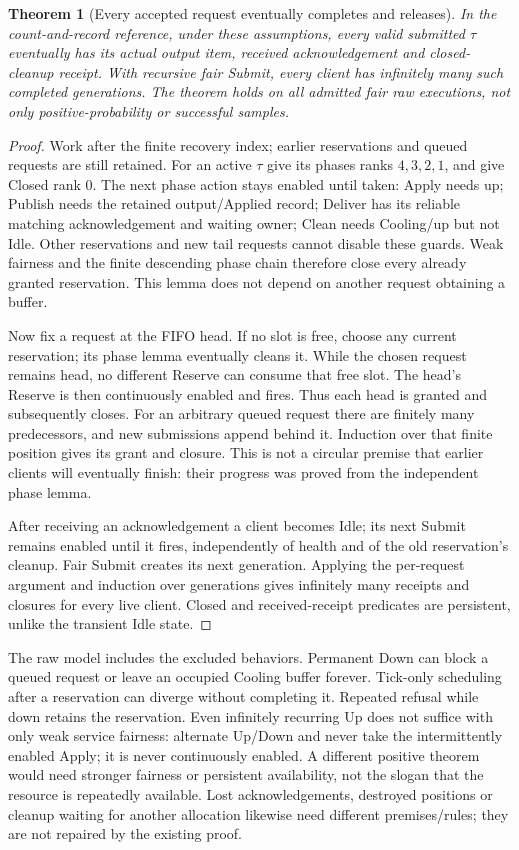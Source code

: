 \documentclass[11pt]{article}
\newtheorem{theorem}{Theorem}
\begin{document}
\begin{theorem}[Every accepted request eventually completes and releases]\label{thm:resource-progress}
In the count-and-record reference, under these assumptions, every valid submitted $\tau$ eventually has its actual output item, received acknowledgement and closed-cleanup receipt. With recursive fair Submit, every client has infinitely many such completed generations. The theorem holds on all admitted fair raw executions, not only positive-probability or successful samples.
\end{theorem}
\begin{proof}
Work after the finite recovery index; earlier reservations and queued requests are still retained. For an active $\tau$ give its phases ranks $4,3,2,1$, and give Closed rank $0$. The next phase action stays enabled until taken: Apply needs up; Publish needs the retained output/Applied record; Deliver has its reliable matching acknowledgement and waiting owner; Clean needs Cooling/up but not Idle. Other reservations and new tail requests cannot disable these guards. Weak fairness and the finite descending phase chain therefore close every already granted reservation. This lemma does not depend on another request obtaining a buffer.

Now fix a request at the FIFO head. If no slot is free, choose any current reservation; its phase lemma eventually cleans it. While the chosen request remains head, no different Reserve can consume that free slot. The head's Reserve is then continuously enabled and fires. Thus each head is granted and subsequently closes. For an arbitrary queued request there are finitely many predecessors, and new submissions append behind it. Induction over that finite position gives its grant and closure. This is not a circular premise that earlier clients will eventually finish: their progress was proved from the independent phase lemma.

After receiving an acknowledgement a client becomes Idle; its next Submit remains enabled until it fires, independently of health and of the old reservation's cleanup. Fair Submit creates its next generation. Applying the per-request argument and induction over generations gives infinitely many receipts and closures for every live client. Closed and received-receipt predicates are persistent, unlike the transient Idle state.
\end{proof}

The raw model includes the excluded behaviors. Permanent Down can block a queued request or leave an occupied Cooling buffer forever. Tick-only scheduling after a reservation can diverge without completing it. Repeated refusal while down retains the reservation. Even infinitely recurring Up does not suffice with only weak service fairness: alternate Up/Down and never take the intermittently enabled Apply; it is never continuously enabled. A different positive theorem would need stronger fairness or persistent availability, not the slogan that the resource is repeatedly available. Lost acknowledgements, destroyed positions or cleanup waiting for another allocation likewise need different premises/rules; they are not repaired by the existing proof.
\end{document}
